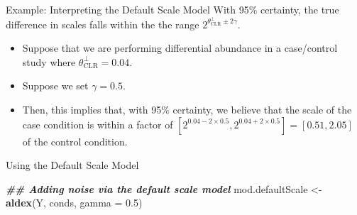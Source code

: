 \documentclass[
  ignorenonframetext,
]{beamer}
\newenvironment{Shaded}{\begin{snugshade}}{\end{snugshade}}
\newcommand{\AttributeTok}[1]{\textcolor[rgb]{0.13,0.29,0.53}{#1}}
\newcommand{\DocumentationTok}[1]{\textcolor[rgb]{0.56,0.35,0.01}{\textbf{\textit{#1}}}}
\newcommand{\FloatTok}[1]{\textcolor[rgb]{0.00,0.00,0.81}{#1}}
\newcommand{\FunctionTok}[1]{\textcolor[rgb]{0.13,0.29,0.53}{\textbf{#1}}}
\newcommand{\NormalTok}[1]{#1}
\newcommand{\OtherTok}[1]{\textcolor[rgb]{0.56,0.35,0.01}{#1}}
\providecommand{\tightlist}{%
  \setlength{\itemsep}{0pt}\setlength{\parskip}{0pt}}
\begin{document}
\begin{frame}{Example: Interpreting the Default Scale Model}
\protect\hypertarget{example-interpreting-the-default-scale-model}{}
With 95\% certainty, the true difference in scales falls within the the
range \(2^{\theta_{\text{CLR}}^\perp \pm 2 \gamma}\).

\pause

\begin{itemize}
\tightlist
\item
  Suppose that we are performing differential abundance in a
  case/control study where \(\theta^\perp_{\text{CLR}} = 0.04\).
\end{itemize}

\pause

\begin{itemize}
\tightlist
\item
  Suppose we set \(\gamma = 0.5\).
\end{itemize}

\pause

\begin{itemize}
\tightlist
\item
  Then, this implies that, with 95\% certainty, we believe that the
  scale of the case condition is within a factor of
  \([2^{0.04 - 2 \times 0.5}, 2^{0.04+ 2 \times 0.5}] = [0.51,2.05]\) of
  the control condition.
\end{itemize}
\end{frame}

\begin{frame}[fragile]{Using the Default Scale Model}
\protect\hypertarget{using-the-default-scale-model}{}
\begin{Shaded}
\begin{Highlighting}[]
\DocumentationTok{\#\# Adding noise via the default scale model}
\NormalTok{mod.defaultScale }\OtherTok{\textless{}{-}} \FunctionTok{aldex}\NormalTok{(Y, conds, }\AttributeTok{gamma =} \FloatTok{0.5}\NormalTok{)}
\end{Highlighting}
\end{Shaded}
\end{frame}
\end{document}
